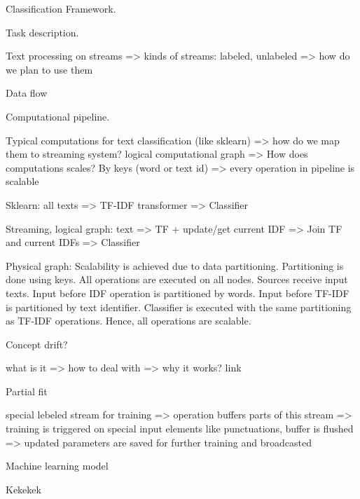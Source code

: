 
Classification Framework.

Task description. 

Text processing on streams => kinds of streams: labeled, unlabeled => how do we plan to use them

Data flow 

Computational pipeline.

Typical computations for text classification (like sklearn) => how do we map them to streaming system? logical computational graph => How does computations scales? By keys (word or text id) => every operation in pipeline is scalable

Sklearn: all texts => TF-IDF transformer => Classifier

Streaming, logical graph: text => TF + update/get current IDF => Join TF and current IDFs => Classifier

Physical graph: Scalability is achieved due to data partitioning. Partitioning is done using keys. All operations are executed on all nodes. Sources receive input texts. Input before IDF operation is partitioned by words. Input before TF-IDF is partitioned by text identifier. Classifier is executed with the same partitioning as TF-IDF operations. Hence, all operations are scalable. 

Concept drift?

what is it => how to deal with => why it works? link

Partial fit

special lebeled stream for training => operation buffers parts of this stream => training is triggered on special input elements like punctuations, buffer is flushed => updated parameters are saved for further training and broadcasted

Machine learning model

Kekekek